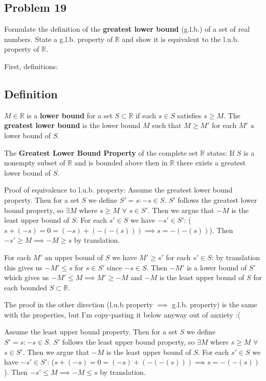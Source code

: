 \documentclass{amsart}
\begin{document}
\newpage
\subsection*{Problem 19}
\noindent Formulate the definition of the \textbf{greatest lower bound} (g.l.b.) of a set of real numbers.
State a g.l.b. property of $\mathbb{R}$ and show it is equivalent to the l.u.b. property of $\mathbb{R}$.

\medskip
\noindent First, definitions:

\subsection*{Definition} $M\in\mathbb{R}$ is a \textbf{lower bound} for a set $S\subset \mathbb{R}$ if each
$s\in S$ satisfies $s\geq M$. The \textbf{greatest lower bound} is the lower bound $M$ such that $M\geq M'$
for each $M'$ a lower bound of $S$.

\medskip
\noindent The \textbf{Greatest Lower Bound Property} of the complete set $\mathbb{R}$ states: If $S$ is a nonempty 
subset of $\mathbb{R}$ and is bounded above then in $\mathbb{R}$ there exists a greatest lower bound of $S$.

\medskip
\noindent Proof of equivalence to l.u.b. property: Assume the greatest lower bound property. Then for a set $S$ we define
$S'={s : -s\in S}$. $S'$ follows the greatest lower bound property, so $\exists M$ where $s\geq M$ $\forall$ $s\in S'$.
Then we argue that $-M$ is the least upper bound of $S$. For each $s'\in S$ we have $-s'\in S'$: ($s+(-s)=0=(-s)+(-(-(s)))
\implies s= -(-(s))$). Then $-s'\geq M\implies -M\geq s$ by translation. 

\medskip
\noindent For each $M'$ an upper bound of $S$ we have $M'\geq s'$
for each $s'\in S$: by translation this gives us $-M'\leq s$ for $s\in S'$ since $-s\in S$. Then $-M'$ is
a lower bound of $S'$ which gives us $-M'\leq M\implies M'\geq -M$ and $-M$ is the least upper bound of $S$ for each 
bounded $S\subset\mathbb{R}$.

\medskip
\noindent The proof in the other direction (l.u.b property $\implies$ g.l.b. property) is the same with the properties,
but I'm copy-pasting it below anyway out of anxiety :(

\medskip
\noindent Assume the least upper bound property. Then for a set $S$ we define
$S'={s : -s\in S}$. $S'$ follows the least upper bound property, so $\exists M$ where $s\geq M$ $\forall$ $s\in S'$.
Then we argue that $-M$ is the least upper bound of $S$. For each $s'\in S$ we have $-s'\in S'$: ($s+(-s)=0=(-s)+(-(-(s)))
\implies s= -(-(s))$). Then $-s'\leq M\implies -M\leq s$ by translation. 
\end{document}
